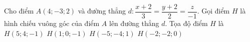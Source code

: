 \begin{ex}
	Cho điểm $A\left(4; - 3; 2\right)$ và đường thẳng $d: \dfrac{x + 2}{3}=\dfrac{y + 2}{2}=\dfrac{z}{- 1}$. Gọi điểm $H$ là hình chiếu vuông góc của điểm $A$ lên đường thẳng $d$. Tọa độ điểm $H$ là
	\choice
	{$H\left(5; 4; - 1\right)$}
	{\True $H\left(1; 0; - 1\right)$}
	{$H\left(- 5; - 4; 1\right)$}
	{$H\left(- 2; - 2; 0\right)$}
\end{ex}

